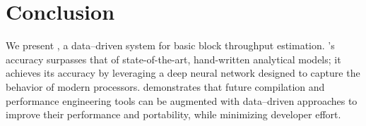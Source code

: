 \section{Conclusion}

We present {\tool}, a data--driven system for basic block throughput estimation.
{\tool}'s accuracy surpasses that of state-of-the-art, hand-written analytical models; it achieves its accuracy by leveraging a deep neural network designed to capture the behavior of modern processors.
{\tool} demonstrates that future compilation and performance engineering tools can be augmented with data--driven approaches to improve their performance and portability, while minimizing developer effort.
